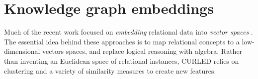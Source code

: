 \section{Knowledge graph embeddings}

Much of the recent work focused on  \textit{embedding} relational data into \textit{vector spaces} \cite{Nickel0TG16,DBLP:conf/nips/Niepert16,Bordes:2011:LSE,Bordes:2013:TEM,DBLP:conf/icml/NiepertAK16}.
The essential idea behind these approaches is to map relational concepts to a low-dimensional vectors spaces, and replace logical reasoning with algebra.
Rather than inventing an Euclidean space of relational instances, CURLED relies on clustering and a variety of similarity measures to create new features.

\cleardoublepage

